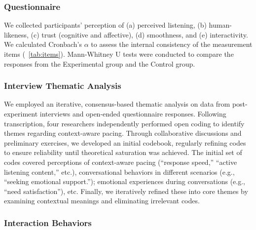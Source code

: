 \subsubsection{Questionnaire}

We collected participants' perception of (a) perceived listening, (b) human-likeness, (c) trust (cognitive and affective), (d) smoothness, and (e) interactivity. We calculated Cronbach's $\alpha$ to assess the internal consistency of the measurement items (\tablename{~\ref{tab:items}}). Mann-Whitney U tests were conducted to compare the responses from the Experimental group and the Control group.

\subsubsection{Interview Thematic Analysis}
We employed an iterative, consensus-based thematic analysis \cite{hammer2014confusing} on data from post-experiment interviews and open-ended questionnaire responses. Following transcription, four researchers independently performed open coding to identify themes regarding context-aware pacing. Through collaborative discussions and preliminary exercises, we developed an initial codebook, regularly refining codes to ensure reliability until theoretical saturation was achieved. The initial set of codes covered perceptions of context-aware pacing (``response speed,'' ``active listening content,'' etc.), conversational behaviors in different scenarios (e.g., ``seeking emotional support.''); emotional experiences during conversations (e.g., ``need satisfaction''), etc. Finally, we iteratively refined these into core themes by examining contextual meanings and eliminating irrelevant codes.

\subsubsection{Interaction Behaviors}

